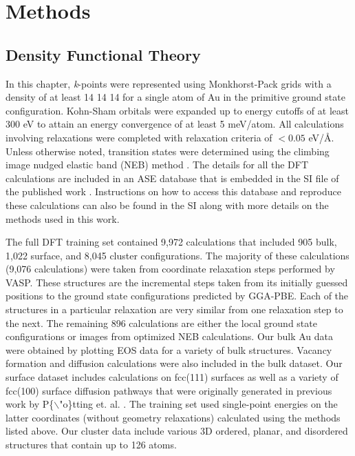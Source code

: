 \documentclass[12pt]{cmuthesis}
\begin{document}
\section{Methods}
\label{sec:org04285df}
\subsection{Density Functional Theory}
\label{sec:org38738da}
In this chapter, \emph{k}-points were represented using Monkhorst-Pack grids \cite{monkhorst-1976-special-point} with a density of at least 14 \texttimes{} 14 \texttimes{} 14 for a single atom of Au in the primitive ground state configuration. Kohn-Sham orbitals were expanded up to energy cutoffs of at least 300 eV to attain an energy convergence of at least 5 meV/atom. All calculations involving relaxations were completed with relaxation criteria of \(< 0.05\) eV/\AA{}. Unless otherwise noted, transition states were determined using the climbing image nudged elastic band (NEB) method \cite{henkelman-2000}. The details for all the DFT calculations are included in an ASE database that is embedded in the SI file of the published work \cite{boes-2016-neural-networ}. Instructions on how to access this database and reproduce these calculations can also be found in the SI along with more details on the methods used in this work.

The full DFT training set contained 9,972 calculations that included 905 bulk, 1,022 surface, and 8,045 cluster configurations. The majority of these calculations (9,076 calculations) were taken from coordinate relaxation steps performed by VASP. These structures are the incremental steps taken from its initially guessed positions to the ground state configurations predicted by GGA-PBE. Each of the structures in a particular relaxation are very similar from one relaxation step to the next. The remaining 896 calculations are either the local ground state configurations or images from optimized NEB calculations. Our bulk Au data were obtained by plotting EOS data for a variety of bulk structures. Vacancy formation and diffusion calculations were also included in the bulk dataset. Our surface dataset includes calculations on fcc(111) surfaces as well as a variety of fcc(100) surface diffusion pathways that were originally generated in previous work by P\{$\backslash$"o\}tting et. al. \cite{potting-2010-self-diffus}. The training set used single-point energies on the latter coordinates (without geometry relaxations) calculated using the methods listed above. Our cluster data include various 3D ordered, planar, and disordered structures that contain up to 126 atoms.
\end{document}
